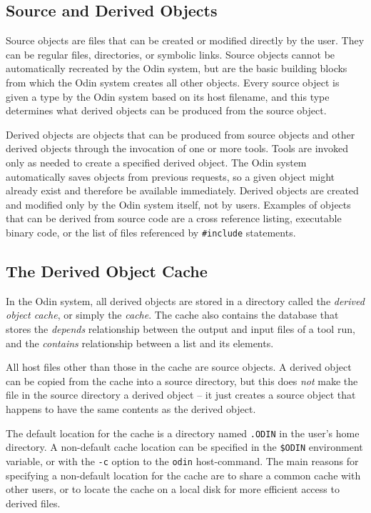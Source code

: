 \documentclass[hidelinks]{report}
\newcommand{\ex}{\tt}   %
\begin{document}
\subsection{Source and Derived Objects}

Source objects are files that can be created or modified directly by the user.
They can be regular files, directories, or symbolic links.
Source objects cannot be automatically recreated by the Odin system,
but are the basic building blocks
from which the Odin system creates all other objects.
Every source object is given a type by the Odin system
based on its host filename,
and this type determines what derived objects can be produced from the
source object.

Derived objects are objects that can be produced
from source objects and other derived objects
through the invocation of one or more tools.
Tools are invoked only as needed to create a specified derived object.
The Odin system automatically saves objects from previous requests,
so a given object might already exist and therefore be available immediately.
Derived objects are created and modified only by the Odin system itself,
not by users.
Examples of objects that can be derived from source code are
a cross reference listing, executable binary code, or the list of files
referenced by {\ex \#include} statements.


\subsection{The Derived Object Cache}
\label{cache}

In the Odin system, all derived objects are stored in a directory
called the {\em derived object cache}, or simply the {\em cache}.
The cache also contains the database that stores the
{\em depends} relationship between the output and input files of a tool run,
and the {\em contains} relationship between a list and its elements.

All host files other than those in the cache are source objects.
A derived object can be copied from the cache into a source directory,
but this does {\em not} make the file in the source directory a derived
object -- it just creates a source object that happens to have the
same contents as the derived object.

The default location for the cache is a directory named {\ex .ODIN}
in the user's home directory.
A non-default cache location can be specified
in the {\ex \$ODIN} environment variable,
or with the {\ex -c} option to the {\ex odin} host-command.
The main reasons for specifying a non-default location for
the cache are to share a common cache with other users,
or to locate the cache on a local disk for more efficient access
to derived files.
\end{document}
